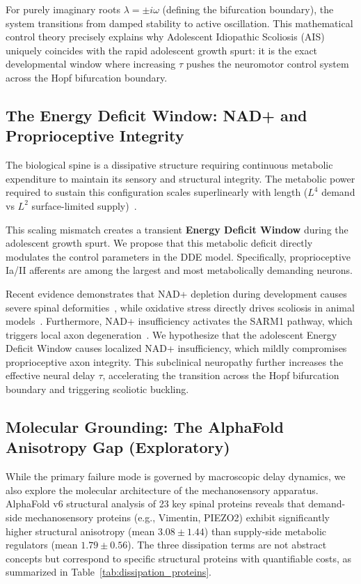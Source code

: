 For purely imaginary roots $\lambda = \pm i\omega$ (defining the bifurcation boundary), the system transitions from damped stability to active oscillation. This mathematical control theory precisely explains why Adolescent Idiopathic Scoliosis (AIS) uniquely coincides with the rapid adolescent growth spurt: it is the exact developmental window where increasing $\tau$ pushes the neuromotor control system across the Hopf bifurcation boundary.

\subsection{The Energy Deficit Window: NAD+ and Proprioceptive Integrity}

The biological spine is a dissipative structure requiring continuous metabolic expenditure to maintain its sensory and structural integrity. The metabolic power required to sustain this configuration scales superlinearly with length ($L^4$ demand vs $L^2$ surface-limited supply)~\cite{sato2025convective}.

This scaling mismatch creates a transient \textbf{Energy Deficit Window} during the adolescent growth spurt. We propose that this metabolic deficit directly modulates the control parameters in the DDE model. Specifically, proprioceptive Ia/II afferents are among the largest and most metabolically demanding neurons.

Recent evidence demonstrates that NAD+ depletion during development causes severe spinal deformities~\cite{basse2021nampt}, while oxidative stress directly drives scoliosis in animal models~\cite{pumputis2025oxidative}. Furthermore, NAD+ insufficiency activates the SARM1 pathway, which triggers local axon degeneration~\cite{gerdts2015sarm1}. We hypothesize that the adolescent Energy Deficit Window causes localized NAD+ insufficiency, which mildly compromises proprioceptive axon integrity. This subclinical neuropathy further increases the effective neural delay $\tau$, accelerating the transition across the Hopf bifurcation boundary and triggering scoliotic buckling.

\subsection{Molecular Grounding: The AlphaFold Anisotropy Gap (Exploratory)}

While the primary failure mode is governed by macroscopic delay dynamics, we also explore the molecular architecture of the mechanosensory apparatus. AlphaFold v6 structural analysis of 23 key spinal proteins reveals that demand-side mechanosensory proteins (e.g., Vimentin, PIEZO2) exhibit significantly higher structural anisotropy (mean $3.08 \pm 1.44$) than supply-side metabolic regulators (mean $1.79 \pm 0.56$). The three dissipation terms are not abstract concepts but correspond to specific structural proteins with quantifiable costs, as summarized in Table~\ref{tab:dissipation_proteins}.


